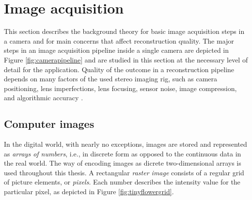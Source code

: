 


\section{Image acquisition} \label{sec:image-acquisition}



This section describes the background theory for basic image acquisition steps in a camera and for main concerns that affect reconstruction quality.
The major steps in an image acquisition pipeline inside a single camera are depicted in Figure \ref{fig:camerapipeline} and are studied in this section at the necessary level of detail for the application.
Quality of the outcome in a reconstruction pipeline depends on many factors of the used stereo imaging rig, such as camera positioning, lens imperfections, lens focusing, sensor noise, image compression, and algorithmic accuracy \cite{hollsten2013imagequality,kyto2011method,rieke2009evaluation}.



\subsection{Computer images} \label{sec:computer-images}

In the digital world, with nearly no exceptions, images are stored and represented as \emph{arrays of numbers}, i.e., in discrete form as opposed to the continuous data in the real world.
The way of encoding images as dicrete two-dimensional arrays is used throughout this thesis.
A rectangular \emph{raster image} consists of a regular grid of picture elements, or \emph{pixels}.
Each number describes the intensity value for the particular pixel, as depicted in Figure \ref{fig:tinyflowergrid}.
\cite[ch. 2.2]{trucco1998introductory}

